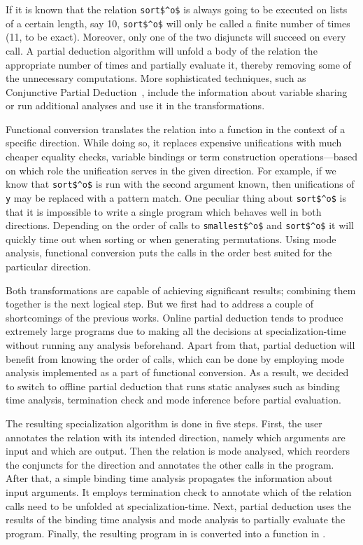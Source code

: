 \documentclass[submission,copyright,creativecommons]{eptcs}
\begin{document}


If it is known that the relation \lstinline{sort$^o$} is always going to be executed on lists of a certain length, say 10, \lstinline{sort$^o$} will only be called a finite number of times (11, to be exact).
Moreover, only one of the two disjuncts will succeed on every call. 
A partial deduction algorithm will unfold a body of the relation the appropriate number of times and partially evaluate it, thereby removing some of the unnecessary computations. 
More sophisticated techniques, such as Conjunctive Partial Deduction~\cite{de1999conjunctive}, include the information about variable sharing or run additional analyses and use it in the transformations. 

Functional conversion translates the relation into a function in the context of a specific direction. 
While doing so, it replaces expensive unifications with much cheaper equality checks, variable bindings or term construction operations---based on which role the unification serves in the given direction. 
For example, if we know that \lstinline{sort$^o$} is run with the second argument known, then unifications of \lstinline{y} may be replaced with a pattern match. 
One peculiar thing about \lstinline{sort$^o$} is that it is impossible to write a single program which behaves well in both directions. 
Depending on the order of calls to \lstinline{smallest$^o$} and \lstinline{sort$^o$} it will quickly time out when sorting or when generating permutations. 
Using mode analysis, functional conversion puts the calls in the order best suited for the particular direction.  

Both transformations are capable of achieving significant results; combining them together is the next logical step. 
But we first had to address a couple of shortcomings of the previous works. 
Online partial deduction tends to produce extremely large programs due to making all the decisions at specialization-time without running any analysis beforehand. 
Apart from that, partial deduction will benefit from knowing the order of calls, which can be done by employing mode analysis implemented as a part of functional conversion. 
As a result, we decided to switch to offline partial deduction that runs static analyses such as binding time analysis, termination check and mode inference before partial evaluation. 

The resulting specialization algorithm is done in five steps. First, the user annotates the relation with its intended direction, namely which arguments are input and which are output. Then the relation is mode analysed, which reorders the conjuncts for the direction and annotates the other calls in the program. After that, a simple binding time analysis propagates the information about input arguments. It employs termination check to annotate which of the relation calls need to be unfolded at specialization-time. Next, partial deduction uses the results of the binding time analysis and mode analysis to partially evaluate the program. Finally, the resulting program in \mk is converted into a function in \haskell. 
\end{document}
